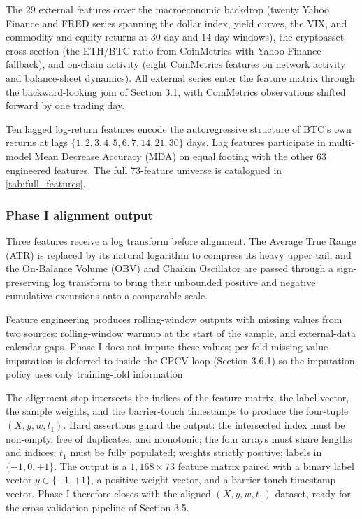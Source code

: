 The 29 external features cover the macroeconomic backdrop (twenty Yahoo Finance and FRED series spanning the dollar index, yield curves, the VIX, and commodity-and-equity returns at 30-day and 14-day windows), the cryptoasset cross-section (the ETH/BTC ratio from CoinMetrics with Yahoo Finance fallback), and on-chain activity (eight CoinMetrics features on network activity and balance-sheet dynamics). All external series enter the feature matrix through the backward-looking join of Section 3.1, with CoinMetrics observations shifted forward by one trading day.

Ten lagged log-return features encode the autoregressive structure of BTC's own returns at lags $\{1, 2, 3, 4, 5, 6, 7, 14, 21, 30\}$ days. Lag features participate in multi-model Mean Decrease Accuracy (MDA) on equal footing with the other 63 engineered features. The full 73-feature universe is catalogued in \label{ref:features_call}\autoref{tab:full_features}.


\subsubsection{Phase I alignment output}\label{subsubsec:alignment}

Three features receive a log transform before alignment. The Average True Range (ATR) is replaced by its natural logarithm to compress its heavy upper tail, and the On-Balance Volume (OBV) and Chaikin Oscillator are passed through a sign-preserving log transform to bring their unbounded positive and negative cumulative excursions onto a comparable scale.

Feature engineering produces rolling-window outputs with missing values from two sources: rolling-window warmup at the start of the sample, and external-data calendar gaps. Phase I does not impute these values; per-fold missing-value imputation is deferred to inside the CPCV loop (Section 3.6.1) so the imputation policy uses only training-fold information.

The alignment step intersects the indices of the feature matrix, the label vector, the sample weights, and the barrier-touch timestamps to produce the four-tuple $(X, y, w, t_1)$. Hard assertions guard the output: the intersected index must be non-empty, free of duplicates, and monotonic; the four arrays must share lengths and indices; $t_1$ must be fully populated; weights strictly positive; labels in $\{-1, 0, +1\}$. The output is a $1{,}168 \times 73$ feature matrix paired with a binary label vector $y \in \{-1, +1\}$, a positive weight vector, and a barrier-touch timestamp vector. Phase I therefore closes with the aligned $(X, y, w, t_1)$ dataset, ready for the cross-validation pipeline of Section 3.5.

